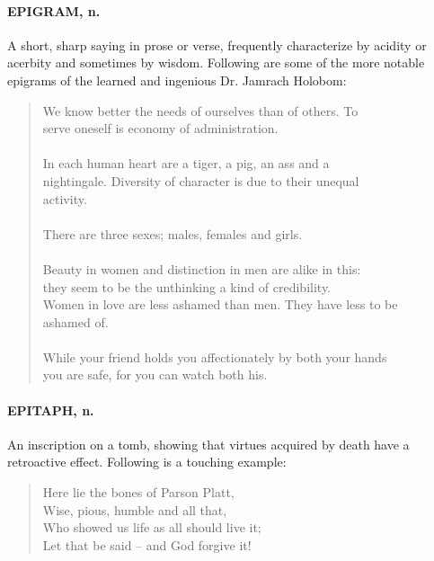 \documentclass[11pt]{article}
\begin{document}
\paragraph{EPIGRAM, n.}  A short, sharp saying in prose or verse, frequently
characterize by acidity or acerbity and sometimes by wisdom.
Following are some of the more notable epigrams of the learned and
ingenious Dr. Jamrach Holobom:

\begin{quote}       We know better the needs of ourselves than of others.  To \\
  serve oneself is economy of administration. \\
 \\
      In each human heart are a tiger, a pig, an ass and a \\
  nightingale.  Diversity of character is due to their unequal \\
  activity. \\
 \\
      There are three sexes; males, females and girls. \\
 \\
      Beauty in women and distinction in men are alike in this: \\
  they seem to be the unthinking a kind of credibility. \\
      Women in love are less ashamed than men.  They have less to be \\
  ashamed of. \\
 \\
      While your friend holds you affectionately by both your hands \\
  you are safe, for you can watch both his.  \end{quote}

\paragraph{EPITAPH, n.}  An inscription on a tomb, showing that virtues acquired
by death have a retroactive effect.  Following is a touching example:

\begin{quote}   Here lie the bones of Parson Platt, \\
  Wise, pious, humble and all that, \\
  Who showed us life as all should live it; \\
  Let that be said -- and God forgive it!  \end{quote}
\end{document}
